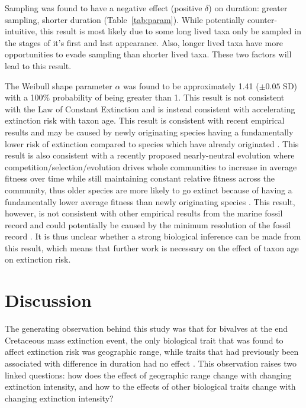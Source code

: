 \documentclass[11pt]{article}
\begin{document}
Sampling was found to have a negative effect (positive \(\delta\)) on duration: greater sampling, shorter duration (Table~\ref{tab:param}). While potentially counter-intuitive, this result is most likely due to some long lived taxa only be sampled in the stages of it's first and last appearance. Also, longer lived taxa have more opportunities to evade sampling than shorter lived taxa. These two factors will lead to this result. 

The Weibull shape parameter \(\alpha\) was found to be approximately 1.41 (\(\pm 0.05\) SD) with a 100\% probability of being greater than 1. This result is not consistent with the Law of Constant Extinction \citep{VanValen1973} and is instead consistent with accelerating extinction risk with taxon age. This result is consistent with recent empirical results and may be caused by newly originating species having a fundamentally lower risk of extinction compared to species which have already originated \citep{Wagner2014b,Quental2013,Smits2015}. This result is also consistent with a recently proposed nearly-neutral evolution where competition/selection/evolution drives whole communities to increase in average fitness over time while still maintaining constant relative fitness across the community, thus older species are more likely to go extinct because of having a fundamentally lower average fitness than newly originating species \citep{Rosindell2015a}. This result, however, is not consistent with other empirical results from the marine fossil record \citep{Finnegan2008,Crampton2016} and could potentially be caused by the minimum resolution of the fossil record \citep{Sepkoski1975}. It is thus unclear whether a strong biological inference can be made from this result, which means that further work is necessary on the effect of taxon age on extinction risk.



\section*{Discussion}



The generating observation behind this study was that for bivalves at the end Cretaceous mass extinction event, the only biological trait that was found to affect extinction risk was geographic range, while traits that had previously been associated with difference in duration had no effect \citep{Jablonski1986}. This observation raises two linked questions: how does the effect of geographic range change with changing extinction intensity, and how to the effects of other biological traits change with changing extinction intensity?
\end{document}
